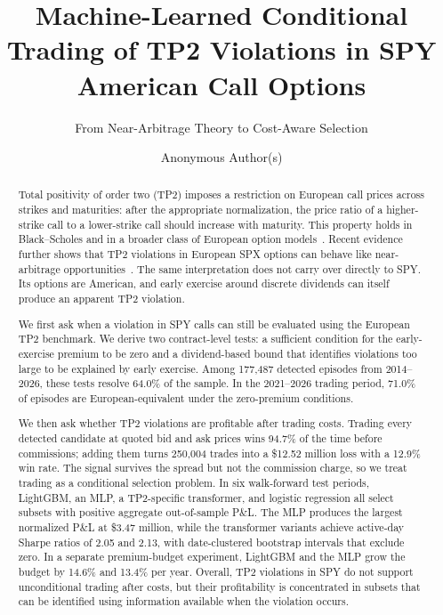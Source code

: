 \documentclass[sigconf,review,anonymous]{acmart}
\begin{document}
\title{Machine-Learned Conditional Trading of TP2 Violations in SPY American Call Options}
\subtitle{From Near-Arbitrage Theory to Cost-Aware Selection}

\author{Anonymous Author(s)}

\renewcommand{\shortauthors}{Anonymous et al.}

\begin{abstract}
Total positivity of order two (TP2) imposes a restriction on European call prices across strikes and maturities: after the appropriate normalization, the price ratio of a higher-strike call to a lower-strike call should increase with maturity. This property holds in Black--Scholes and in a broader class of European option models~\cite{glasserman2026tp2theory}. Recent evidence further shows that TP2 violations in European SPX options can behave like near-arbitrage opportunities~\cite{glasserman2025tp2}. The same interpretation does not carry over directly to SPY. Its options are American, and early exercise around discrete dividends can itself produce an apparent TP2 violation.

We first ask when a violation in SPY calls can still be evaluated using the European TP2 benchmark. We derive two contract-level tests: a sufficient condition for the early-exercise premium to be zero and a dividend-based bound that identifies violations too large to be explained by early exercise. Among 177{,}487 detected episodes from 2014--2026, these tests resolve 64.0\% of the sample. In the 2021--2026 trading period, 71.0\% of episodes are European-equivalent under the zero-premium conditions.

We then ask whether TP2 violations are profitable after trading costs. Trading every detected candidate at quoted bid and ask prices wins 94.7\% of the time before commissions; adding them turns 250{,}004 trades into a \$12.52 million loss with a 12.9\% win rate. The signal survives the spread but not the commission charge, so we treat trading as a conditional selection problem. In six walk-forward test periods, LightGBM, an MLP, a TP2-specific transformer, and logistic regression all select subsets with positive aggregate out-of-sample P\&L. The MLP produces the largest normalized P\&L at \$3.47 million, while the transformer variants achieve active-day Sharpe ratios of 2.05 and 2.13, with date-clustered bootstrap intervals that exclude zero. In a separate premium-budget experiment, LightGBM and the MLP grow the budget by 14.6\% and 13.4\% per year. Overall, TP2 violations in SPY do not support unconditional trading after costs, but their profitability is concentrated in subsets that can be identified using information available when the violation occurs.
\end{abstract}
\end{document}
